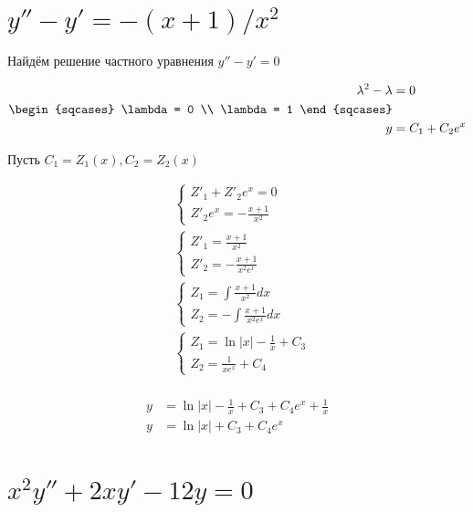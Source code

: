 \section{$y''-y'=-(x+1)/x^2$}

Найдём решение частного уравнения $y'' - y' = 0$

\begin{align*}
    \lambda^2 - \lambda & = 0             \\
    \begin{sqcases}
        \lambda = 0 \\
        \lambda = 1
    \end{sqcases}             \\
    y                   & = C_1 + C_2 e^x
\end{align*}

Пусть \(C_1 = Z_1(x), C_2 = Z_2(x)\)

\begin{align*}
     & \begin{cases}
        Z'_1 + Z'_2 e^x = 0 \\
        Z'_2 e^x = -\frac{x + 1}{x^2}
    \end{cases} \\
     & \begin{cases}
        Z'_1 = \frac{x + 1}{x^2} \\
        Z'_2 = -\frac{x + 1}{x^2e^x}
    \end{cases} \\
     & \begin{cases}
        Z_1 = \int \frac{x + 1}{x^2}dx \\
        Z_2 = -\int \frac{x + 1}{x^2e^x} dx
    \end{cases} \\
     & \begin{cases}
        Z_1 = \ln |x| - \frac{1}{x} + C_3 \\
        Z_2 = \frac{1}{xe^x} + C_4
    \end{cases} \\
\end{align*}

\begin{align*}
    y & =  \ln |x| - \frac{1}{x} + C_3 + C_4e^x + \frac{1}{x} \\
    y & =  \ln |x| + C_3 + C_4e^x                             \\
\end{align*}

\section{$x^2y''+2xy'-12y=0$}

